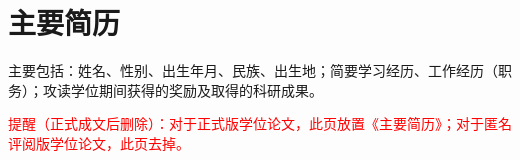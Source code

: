 \chapter*{主要简历}

主要包括：姓名、性别、出生年月、民族、出生地；简要学习经历、工作经历（职务）；攻读学位期间获得的奖励及取得的科研成果。

\textcolor{red}{提醒（正式成文后删除）：对于正式版学位论文，此页放置《主要简历》；对于匿名评阅版学位论文，此页去掉。}
